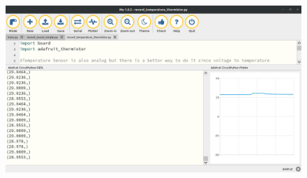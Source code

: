{\begin{figure}[H]
\begin{center}
    \includegraphics[width=\textwidth]{Figures/thermistor_mu.png}
  \end{center}
\end{figure}
}
